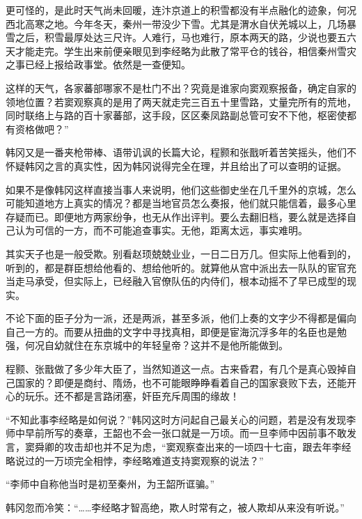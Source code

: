 更可怪的，是此时天气尚未回暖，连汴京道上的积雪都没有半点融化的迹象，何况西北高寒之地。今年冬天，秦州一带没少下雪。尤其是渭水自伏羌城以上，几场暴雪之后，积雪最厚处达三尺许。人难行，马也难行，原本两天的路，少说也要五六天才能走完。学生出来前便亲眼见到李经略为此散了常平仓的钱谷，相信秦州雪灾之事已经上报给政事堂。依然是一查便知。

这样的天气，各家蕃部哪家不是杜门不出？究竟是谁家向窦观察报备，确定自家的领地位置？若窦观察真的是用了两天就走完三百五十里雪路，丈量完所有的荒地，同时联络上与路的百十家蕃部，这手段，区区秦凤路副总管可安不下他，枢密使都有资格做吧？”

韩冈又是一番夹枪带棒、语带讥讽的长篇大论，程颢和张戬听着苦笑摇头，他们不怀疑韩冈之言的真实性，因为韩冈说得完全在理，并且给出了可以查明的证据。

如果不是像韩冈这样直接当事人来说明，他们这些御史坐在几千里外的京城，怎么可能知道地方上真实的情况？都是当地官员怎么奏报，他们就只能信着，最多心里存疑而已。即便地方两家纷争，也无从作出评判。要么去翻旧档，要么就是选择自己认为可信的一方，而不可能追查事实。无他，距离太远，事实难明。

其实天子也是一般受欺。别看赵顼兢兢业业，一日二日万几。但实际上他看到的，听到的，都是群臣想给他看的、想给他听的。就算他从宫中派出去一队队的宦官充当走马承受，但实际上，已经融入官僚队伍的内侍们，根本动摇不了早已成型的现实。

不论下面的臣子分为一派，还是两派，甚至多派，他们上奏的文字少不得都是偏向自己一方的。而要从扭曲的文字中寻找真相，即便是宦海沉浮多年的名臣也是勉强，何况自幼就住在东京城中的年轻皇帝？这并不是他所能做到。

程颢、张戬做了多少年大臣了，当然知道这一点。古来昏君，有几个是真心毁掉自己国家的？即便是商纣、隋炀，也不可能眼睁睁看着自己的国家衰败下去，还能开心的玩乐。还不都是言路闭塞，奸臣充斥周围的缘故！

“不知此事李经略是如何说？”韩冈这时方问起自己最关心的问题，若是没有发现李师中早前所写的奏章，王韶也不会一张口就是一万顷。而一旦李师中因前事不敢发言，窦舜卿的攻击却也并不足为虑，“窦观察查出来的一顷四十七亩，跟去年李经略说过的一万顷完全相悖，李经略难道支持窦观察的说法？”

“李师中自称他当时是初至秦州，为王韶所诓骗。”

韩冈忽而冷笑：“……李经略才智高绝，欺人时常有之，被人欺却从来没有听说。”

